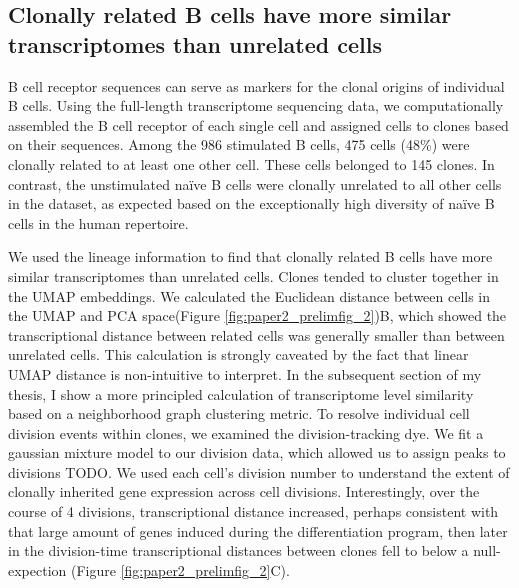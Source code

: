\subsection{Clonally related B cells have more similar transcriptomes than unrelated cells}
B cell receptor sequences can serve as markers for the clonal origins of individual B cells. Using the full-length transcriptome sequencing data, we computationally assembled the B cell receptor of each single cell and assigned cells to clones based on their sequences. Among the 986 stimulated B cells, 475 cells (48\%) were clonally related to at least one other cell. These cells belonged to 145 clones. In contrast, the unstimulated naïve B cells were clonally unrelated to all other cells in the dataset, as expected based on the exceptionally high diversity of naïve B cells in the human repertoire\cite{briney2019commonality}.

We used the lineage information to find that clonally related B cells have more similar transcriptomes than unrelated cells. Clones tended to cluster together in the UMAP embeddings. We calculated the Euclidean distance between cells in the UMAP and PCA space(Figure \ref{fig:paper2_prelimfig_2})B, which showed the transcriptional distance between related cells was generally smaller than between unrelated cells. This calculation is strongly caveated by the fact that linear UMAP distance is non-intuitive to interpret. In the subsequent section of my thesis, I show a more principled calculation of transcriptome level similarity based on a neighborhood graph clustering metric. To resolve individual cell division events within clones, we examined the division-tracking dye\cite{hasbold1998cell}. We fit a gaussian mixture model to our division data, which allowed us to assign peaks to divisions TODO. We used each cell’s division number to understand the extent of clonally inherited gene expression across cell divisions. Interestingly, over the course of 4 divisions, transcriptional distance increased, perhaps consistent with that large amount of genes induced during the differentiation program, then later in the division-time transcriptional distances between clones fell to below a null-expection  (Figure \ref{fig:paper2_prelimfig_2}C).  

